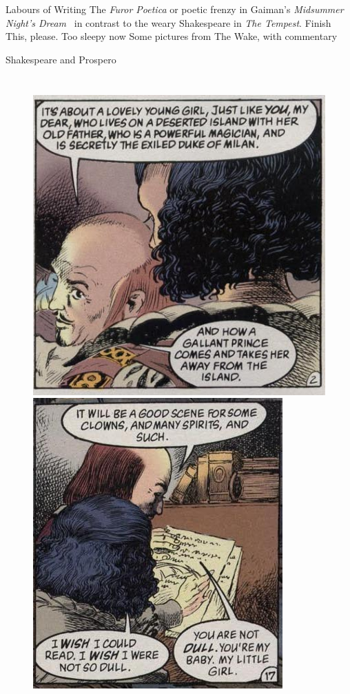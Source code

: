 \documentclass{beamer}
\begin{document}
  \begin{frame}{Labours of Writing}
    The \emph{Furor Poetica} or poetic frenzy in Gaiman's \emph{Midsummer Night's Dream}~\cite{gaimanmnd} in contrast to the weary Shakespeare in \emph{The Tempest}. 
    Finish This, please. Too sleepy now
    Some pictures from The Wake, with commentary
  \end{frame}

  \begin{frame}{Shakespeare and Prospero}
    \begin{columns}[c]
      \begin{figure}[htp]
        \begin{center}
          \centering
          \includegraphics[scale=0.35]{judith.jpg}
          \includegraphics[scale=0.35]{judith2.jpg}
        \end{center}
      \end{figure}
      

\end{columns}
\end{frame}
\end{document}
